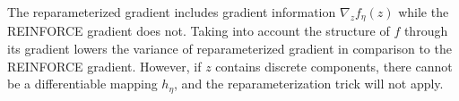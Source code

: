 The reparameterized gradient includes gradient information $\nabla_z f_\eta(z)$ while the REINFORCE gradient does not. Taking into account the structure of $f$ through its gradient lowers the variance of reparameterized gradient in comparison to the REINFORCE gradient. 
However, if $z$ contains discrete components, there cannot be a differentiable mapping $h_\eta$, and the reparameterization trick will not apply. 

